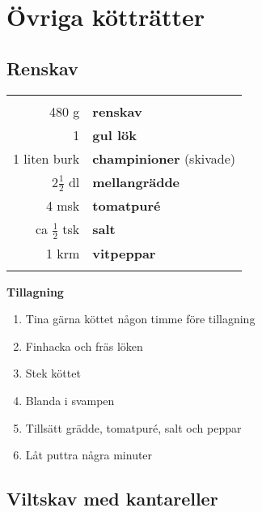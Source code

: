 
\section{Övriga kötträtter}

\clearpage

\subsection{Renskav}

\begin{table}[H]
	\begin{tabular}{rl}
	\hline
	&\\
		480 g & \textbf{renskav}\\
		1 & \textbf{gul lök}\\
		1 liten burk & \textbf{champinioner} (skivade)\\
		2$\frac{1}{2}$ dl & \textbf{mellangrädde}\\
		4 msk & \textbf{tomatpuré}\\
		ca $\frac{1}{2}$ tsk & \textbf{salt}\\
		1 krm & \textbf{vitpeppar}\\
	&\\
	\hline
	\end{tabular}
\end{table}


\begin{multicols*}{2}

\noindent \textbf{Tillagning}
\begin{enumerate}
	\itemsep0cm
	\item Tina gärna köttet någon timme före tillagning
	\item Finhacka och fräs löken
	\item Stek köttet
	\item Blanda i svampen
	\item Tillsätt grädde, tomatpuré, salt och peppar
	\item Låt puttra några minuter
\end{enumerate}

\end{multicols*}

\clearpage

\subsection{Viltskav med kantareller}

